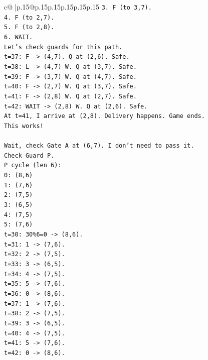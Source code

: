\documentclass{article}
\begin{document}
{\begin{supertabular}{c@{$\;$}|p{.15\linewidth}@{}p{.15\linewidth}p{.15\linewidth}p{.15\linewidth}p{.15\linewidth}p{.15\linewidth}}
{{{\texttt{3. F (to 3,7).} \\
\texttt{4. F (to 2,7).} \\
\texttt{5. F (to 2,8).} \\
\texttt{6. WAIT.} \\
\texttt{Let's check guards for this path.} \\
\texttt{t=37: F {-}> (4,7). Q at (2,6). Safe.} \\
\texttt{t=38: L {-}> (4,7) W. Q at (3,7). Safe.} \\
\texttt{t=39: F {-}> (3,7) W. Q at (4,7). Safe.} \\
\texttt{t=40: F {-}> (2,7) W. Q at (3,7). Safe.} \\
\texttt{t=41: F {-}> (2,8) W. Q at (2,7). Safe.} \\
\texttt{t=42: WAIT {-}> (2,8) W. Q at (2,6). Safe.} \\
\texttt{At t=41, I arrive at (2,8). Delivery happens. Game ends.} \\
\texttt{This works!} \\
\\ 
\texttt{Wait, check Gate A at (6,7). I don't need to pass it.} \\
\texttt{Check Guard P.} \\
\texttt{P cycle (len 6):} \\
\texttt{0: (8,6)} \\
\texttt{1: (7,6)} \\
\texttt{2: (7,5)} \\
\texttt{3: (6,5)} \\
\texttt{4: (7,5)} \\
\texttt{5: (7,6)} \\
\texttt{t=30: 30\%6=0 {-}> (8,6).} \\
\texttt{t=31: 1 {-}> (7,6).} \\
\texttt{t=32: 2 {-}> (7,5).} \\
\texttt{t=33: 3 {-}> (6,5).} \\
\texttt{t=34: 4 {-}> (7,5).} \\
\texttt{t=35: 5 {-}> (7,6).} \\
\texttt{t=36: 0 {-}> (8,6).} \\
\texttt{t=37: 1 {-}> (7,6).} \\
\texttt{t=38: 2 {-}> (7,5).} \\
\texttt{t=39: 3 {-}> (6,5).} \\
\texttt{t=40: 4 {-}> (7,5).} \\
\texttt{t=41: 5 {-}> (7,6).} \\
\texttt{t=42: 0 {-}> (8,6).} \\
}}}
\end{supertabular}}
\end{document}

